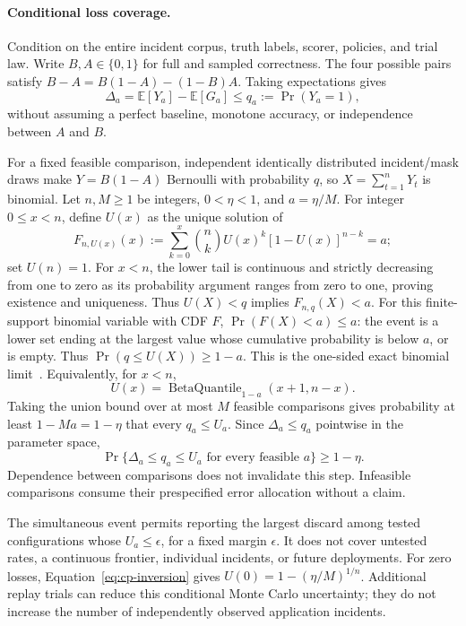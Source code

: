 \paragraph{Conditional loss coverage.}
Condition on the entire incident corpus, truth labels, scorer, policies, and trial law. Write $B,A\in\{0,1\}$ for full and sampled correctness. The four possible pairs satisfy $B-A=B(1-A)-(1-B)A$. Taking expectations gives
\begin{equation}\label{eq:loss-bound}
 \Delta_a=\mathbb E[Y_a]-\mathbb E[G_a]\le q_a:=\Pr(Y_a=1),
\end{equation}
without assuming a perfect baseline, monotone accuracy, or independence between $A$ and $B$.

For a fixed feasible comparison, independent identically distributed incident/mask draws make $Y=B(1-A)$ Bernoulli with probability $q$, so $X=\sum_{t=1}^{n}Y_t$ is binomial. Let $n,M\ge1$ be integers, $0<\eta<1$, and $a=\eta/M$. For integer $0\le x<n$, define $U(x)$ as the unique solution of
\begin{equation}\label{eq:cp-inversion}
 F_{n,U(x)}(x):=\sum_{k=0}^{x}\binom nk U(x)^k[1-U(x)]^{n-k}=a;
\end{equation}
set $U(n)=1$. For $x<n$, the lower tail is continuous and strictly decreasing from one to zero as its probability argument ranges from zero to one, proving existence and uniqueness. Thus $U(X)<q$ implies $F_{n,q}(X)<a$. For this finite-support binomial variable with CDF $F$, $\Pr(F(X)<a)\le a$: the event is a lower set ending at the largest value whose cumulative probability is below $a$, or is empty. Thus $\Pr(q\le U(X))\ge1-a$. This is the one-sided exact binomial limit~\cite{clopper1934confidence,nistExactBinomial}. Equivalently, for $x<n$,
\[
 U(x)=\operatorname{BetaQuantile}_{1-a}(x+1,n-x).
\]
Taking the union bound over at most $M$ feasible comparisons gives probability at least $1-Ma=1-\eta$ that every $q_a\le U_a$. Since $\Delta_a\le q_a$ pointwise in the parameter space,
\begin{equation}\label{eq:simultaneous}
 \Pr\{\Delta_a\le q_a\le U_a\text{ for every feasible }a\}\ge1-\eta.
\end{equation} Dependence between comparisons does not invalidate this step. Infeasible comparisons consume their prespecified error allocation without a claim.

The simultaneous event permits reporting the largest discard among tested configurations whose $U_a\le\epsilon$, for a fixed margin $\epsilon$. It does not cover untested rates, a continuous frontier, individual incidents, or future deployments. For zero losses, Equation~\eqref{eq:cp-inversion} gives $U(0)=1-(\eta/M)^{1/n}$. Additional replay trials can reduce this conditional Monte Carlo uncertainty; they do not increase the number of independently observed application incidents.
